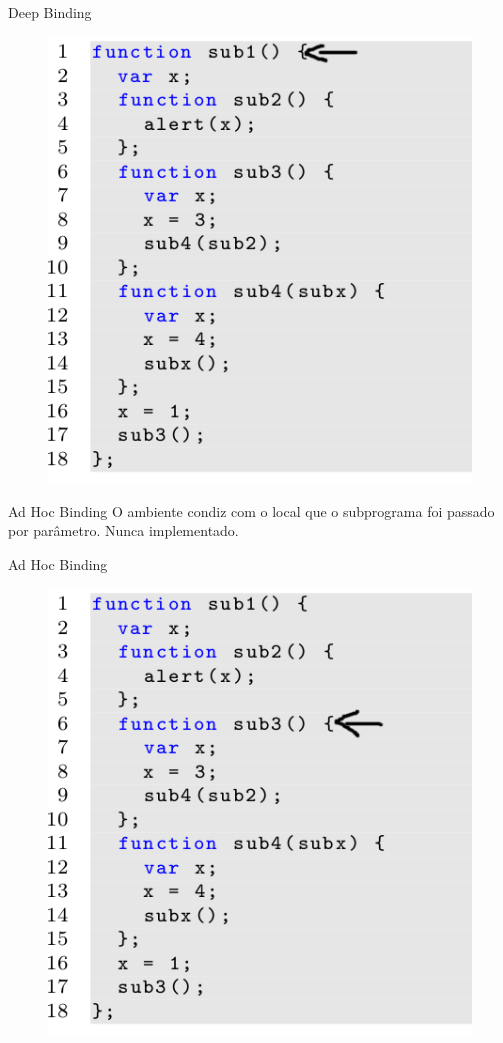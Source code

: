 \begin{frame}{Deep Binding}
	\begin{figure}[ht!]
		\centering
		\includegraphics[scale=0.4]{./imgs/js-deep}
	\end{figure}
\end{frame}

\begin{frame}{Ad Hoc Binding}
	O ambiente condiz com o local que o subprograma foi passado por parâmetro.
	Nunca implementado.
\end{frame}

\begin{frame}{Ad Hoc Binding}
	\begin{figure}[ht!]
		\centering
		\includegraphics[scale=0.4]{./imgs/js-adhoc}
	\end{figure}
\end{frame}
